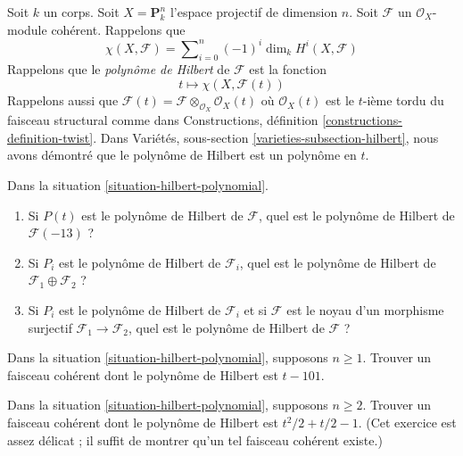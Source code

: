 \begin{situation}
\label{situation-hilbert-polynomial}
Soit $k$ un corps. Soit $X = \mathbf{P}^n_k$
l'espace projectif de dimension $n$. Soit $\mathcal{F}$
un $\mathcal{O}_X$-module cohérent. Rappelons que
$$
\chi(X, \mathcal{F}) =
\sum\nolimits_{i = 0}^n (-1)^i \dim_k H^i(X, \mathcal{F})
$$
Rappelons que le {\it polynôme de Hilbert} de $\mathcal{F}$ est la fonction
$$
t \longmapsto \chi(X, \mathcal{F}(t))
$$
Rappelons aussi que
$\mathcal{F}(t) = \mathcal{F} \otimes_{\mathcal{O}_X} \mathcal{O}_X(t)$
où $\mathcal{O}_X(t)$ est le $t$-ième tordu du faisceau structural
comme dans Constructions, définition \ref{constructions-definition-twist}.
Dans Variétés, sous-section \ref{varieties-subsection-hilbert}, nous avons
démontré que le polynôme de Hilbert est un polynôme en $t$.
\end{situation}

\begin{exercise}
\label{exercise-hilbert-pol-easy}
Dans la situation \ref{situation-hilbert-polynomial}.
\begin{enumerate}
\item Si $P(t)$ est le polynôme de Hilbert de $\mathcal{F}$,
quel est le polynôme de Hilbert de $\mathcal{F}(-13)$ ?
\item Si $P_i$ est le polynôme de Hilbert de $\mathcal{F}_i$,
quel est le polynôme de Hilbert de $\mathcal{F}_1 \oplus \mathcal{F}_2$ ?
\item Si $P_i$ est le polynôme de Hilbert de $\mathcal{F}_i$ et si
$\mathcal{F}$ est le noyau d'un morphisme surjectif
$\mathcal{F}_1 \to \mathcal{F}_2$, quel est le polynôme de Hilbert de
$\mathcal{F}$ ?
\end{enumerate}
\end{exercise}

\begin{exercise}
\label{exercise-find-given-hilbert-pol-dim-1}
Dans la situation \ref{situation-hilbert-polynomial}, supposons $n \geq 1$.
Trouver un faisceau cohérent dont le polynôme de Hilbert est $t - 101$.
\end{exercise}

\begin{exercise}
\label{exercise-find-given-hilbert-pol-dim-2}
Dans la situation \ref{situation-hilbert-polynomial}, supposons $n \geq 2$.
Trouver un faisceau cohérent dont le polynôme de Hilbert est
$t^2/2 + t/2 - 1$. (Cet exercice est assez délicat ; il suffit
de montrer qu'un tel faisceau cohérent existe.)
\end{exercise}


